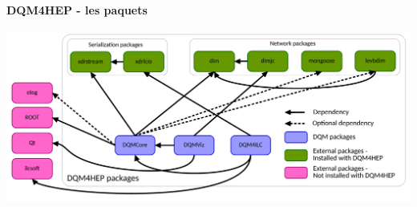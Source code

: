 \documentclass[8pt]{beamer}
\begin{document}
  \begin{frame}
  \frametitle{\secname}
  \framesubtitle{DQM4HEP - les paquets}
    \begin{center}
      \includegraphics[width=\linewidth]{PackagesDiagram.pdf}
    \end{center}
  \end{frame}
\end{document}
